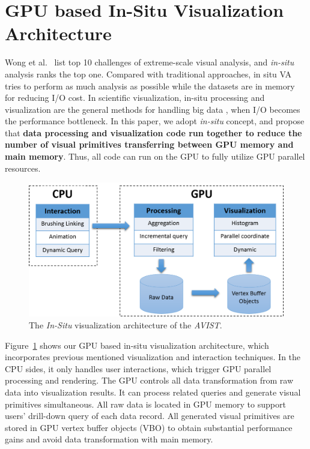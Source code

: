\section{GPU based In-Situ Visualization Architecture}
Wong et al.~\cite{wong2012top} list top 10 challenges of extreme-scale visual analysis, and \emph{in-situ} analysis ranks the top one. Compared with traditional approaches, in situ VA tries to perform as much analysis as possible while the datasets are in memory for reducing I/O cost. In scientific visualization, in-situ processing and visualization are the general methods for handling big data \cite{ma2007situ},  when I/O becomes the performance bottleneck. 
In this paper, we adopt \emph{in-situ} concept, and propose that 
\textbf{data processing and visualization code  run together to reduce the number of visual primitives transferring between GPU memory and main memory}. Thus, all code can run on the GPU to fully utilize GPU parallel resources.

\begin{figure}[htb]
	\centering
	\includegraphics[width=1.0\linewidth]{pic/in-situ.png}
	\parbox[t]{1.0\columnwidth}{\relax
	}
	\caption{\label{fig:architecture} The \emph{In-Situ} visualization architecture of the \emph{AVIST}.}
\end{figure}


Figure~\ref{fig:architecture} shows our GPU based in-situ visualization architecture, which incorporates previous mentioned visualization and interaction techniques. In the CPU sides, it only handles user interactions,  which trigger GPU parallel processing and rendering. The GPU controls all data transformation from  raw data into visualization results. It can process related queries and generate visual primitives simultaneous. All raw data is located in GPU memory to support users' drill-down query of each data record. All generated visual primitives are stored in GPU vertex buffer objects (VBO) to obtain substantial performance gains and avoid data transformation with main memory.
 


